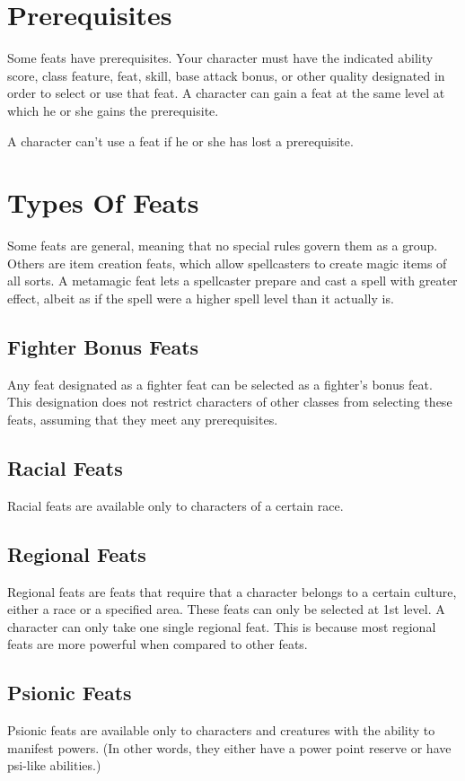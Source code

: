 \section{Prerequisites}
Some feats have prerequisites. Your character must have the indicated ability score, class feature, feat, skill, base attack bonus, or other quality designated in order to select or use that feat. A character can gain a feat at the same level at which he or she gains the prerequisite.

A character can't use a feat if he or she has lost a prerequisite.

\section{Types Of Feats}
Some feats are general, meaning that no special rules govern them as a group. Others are item creation feats, which allow spellcasters to create magic items of all sorts. A metamagic feat lets a spellcaster prepare and cast a spell with greater effect, albeit as if the spell were a higher spell level than it actually is.

\subsection{Fighter Bonus Feats}
Any feat designated as a fighter feat can be selected as a fighter's bonus feat. This designation does not restrict characters of other classes from selecting these feats, assuming that they meet any prerequisites.

\subsection{Racial Feats}
Racial feats are available only to characters of a certain race. 

\subsection{Regional Feats}
Regional feats are feats that require that a character belongs to a certain culture, either a race or a specified area. These feats can only be selected at 1st level. A character can only take one single regional feat. This is because most regional feats are more powerful when compared to other feats.

\subsection{Psionic Feats}
Psionic feats are available only to characters and creatures with the ability to manifest powers. (In other words, they either have a power point reserve or have psi-like abilities.)

